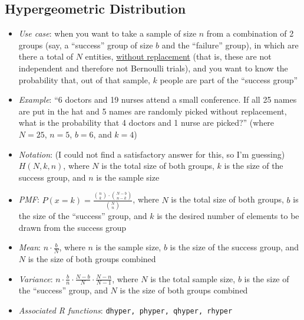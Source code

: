 \documentclass[12pt]{article}
\begin{document}
\subsection{Hypergeometric Distribution}
\begin{itemize}
	\item \textit{Use case}: when you want to take a sample of size $n$ from a
	      combination of 2 groups (say, a ``success'' group of size $b$ and the
	      ``failure'' group), in which are there a total of $N$ entities,
	      \underline{without replacement} (that is, these are not independent and
	      therefore not Bernoulli trials), and you want to know the probability
	      that, out of that sample, $k$ people are part of the ``success group''
	\item \textit{Example}: ``6 doctors and 19 nurses attend
	      a small conference. If all 25 names are put in the
	      hat and 5 names are randomly picked without
	      replacement, what is the probability that 4 doctors
	      and 1 nurse are picked?'' (where $N = 25$, $n = 5$, $b = 6$, and $k =
		      4$)
	\item \textit{Notation}: (I could not find a satisfactory answer for this,
	      so I'm guessing) $H(N, k, n)$, where $N$ is the total size of both
	      groups, $k$ is the size of the success group, and $n$ is the sample
	      size
	\item \textit{PMF}: $P(x = k) = \frac{{n\choose k} \cdot {N - b \choose n -
				      k}}{{N \choose n}}$, where $N$ is the total size of both groups, $b$ is
	      the size of the ``success'' group, and $k$ is the desired number of
	      elements to be drawn from the success group
	\item \textit{Mean}: $n \cdot \frac{b}{N}$, where $n$ is
	      the sample size, $b$ is the size of the success
	      group, and $N$ is the size of both groups combined
	\item \textit{Variance}: $n \cdot \frac{b}{n} \cdot
		      \frac{N - b}{N} \cdot \frac{N - n}{N - 1}$, where
	      $N$ is the total sample size, $b$ is the size of the
	      ``success'' group, and $N$ is the size of both
	      groups combined
	\item \textit{Associated R functions}: \verb|dhyper, phyper, qhyper, rhyper|
\end{itemize}
\end{document}
